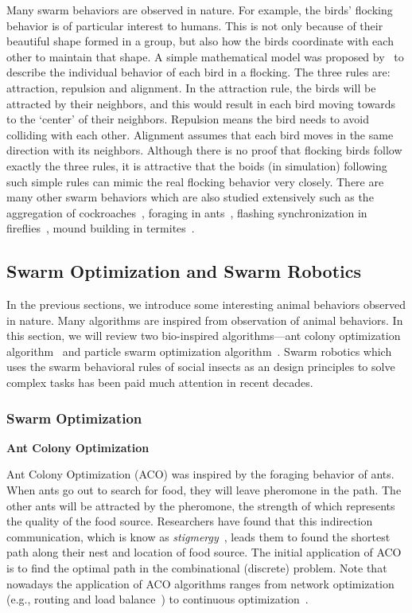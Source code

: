 Many swarm behaviors are observed in nature. For example, the birds' flocking behavior is of particular interest to humans. This is not only because of their beautiful shape formed in a group, but also how the birds coordinate with each other to maintain that shape. A simple mathematical model was proposed by~\cite{Craig:CG:1987} to describe the individual behavior of each bird in a flocking. The three rules are: attraction, repulsion and alignment. In the attraction rule, the birds will be attracted by their neighbors, and this would result in each bird moving towards to the `center' of their neighbors. Repulsion means the bird needs to avoid colliding with each other. Alignment assumes that each bird moves in the same direction with its neighbors. Although there is no proof that flocking birds follow exactly the three rules, it is attractive that the boids (in simulation) following such simple rules can mimic the real flocking behavior very closely. There are many other swarm behaviors which are also studied extensively such as the aggregation of cockroaches~\cite{Jeanson:AB:2005}, foraging in ants~\cite{Carroll1973}, flashing synchronization in fireflies~\cite{James:ARE:1971}, mound building in termites~\cite{Bruinsma:PHD:1979}. 

\subsection{Swarm Optimization and Swarm Robotics}\label{sec:swarm_optimization_swarm_robotics}

In the previous sections, we introduce some interesting animal behaviors observed in nature. Many algorithms are inspired from observation of animal behaviors. In this section, we will review two bio-inspired algorithms---ant colony optimization algorithm~\cite{Dorigo_1997} and particle swarm optimization algorithm~\cite{Kennedy:ICNN:1995}. Swarm robotics which uses the swarm behavioral rules of social insects as an design principles to solve complex tasks has been paid much attention in recent decades. 

\subsubsection{Swarm Optimization}

\textbf{Ant Colony Optimization}

Ant Colony Optimization (ACO) was inspired by the foraging behavior of ants. When ants go out to search for food, they will leave pheromone in the path. The other ants will be attracted by the pheromone, the strength of which represents the quality of the food source. Researchers have found that this indirection communication, which is know as \textit{stigmergy}~\cite{Holland:AL:1999}, leads them to found the shortest path along their nest and location of food source. The initial application of ACO is to find the optimal path in the combinational (discrete) problem. Note that nowadays the application of ACO algorithms ranges from network optimization (e.g., routing and load balance~\cite{DiCaro:JAIR:1998}) to continuous optimization~\cite{Dorigo:LNCS:2004}.   

